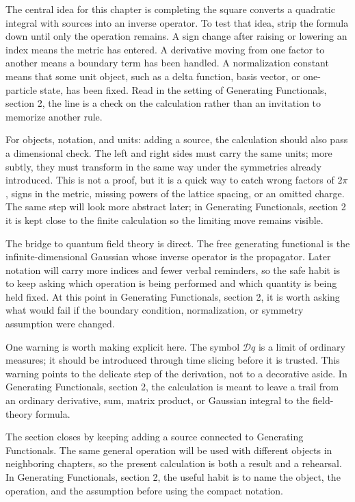The central idea for this chapter is completing the square converts a quadratic integral with sources into an inverse operator.  To test that idea, strip the formula down until only the operation remains.  A sign change after raising or lowering an index means the metric has entered.  A derivative moving from one factor to another means a boundary term has been handled.  A normalization constant means that some unit object, such as a delta function, basis vector, or one-particle state, has been fixed.  Read in the setting of Generating Functionals, section 2, the line is a check on the calculation rather than an invitation to memorize another rule.

For objects, notation, and units: adding a source, the calculation should also pass a dimensional check.  The left and right sides must carry the same units; more subtly, they must transform in the same way under the symmetries already introduced.  This is not a proof, but it is a quick way to catch wrong factors of \(2\pi\), signs in the metric, missing powers of the lattice spacing, or an omitted charge.  The same step will look more abstract later; in Generating Functionals, section 2 it is kept close to the finite calculation so the limiting move remains visible.

The bridge to quantum field theory is direct.  The free generating functional is the infinite-dimensional Gaussian whose inverse operator is the propagator.  Later notation will carry more indices and fewer verbal reminders, so the safe habit is to keep asking which operation is being performed and which quantity is being held fixed.  At this point in Generating Functionals, section 2, it is worth asking what would fail if the boundary condition, normalization, or symmetry assumption were changed.

One warning is worth making explicit here.  The symbol \(\mathcal D q\) is a limit of ordinary measures; it should be introduced through time slicing before it is trusted.  This warning points to the delicate step of the derivation, not to a decorative aside.  In Generating Functionals, section 2, the calculation is meant to leave a trail from an ordinary derivative, sum, matrix product, or Gaussian integral to the field-theory formula.

The section closes by keeping adding a source connected to Generating Functionals.  The same general operation will be used with different objects in neighboring chapters, so the present calculation is both a result and a rehearsal.  In Generating Functionals, section 2, the useful habit is to name the object, the operation, and the assumption before using the compact notation.



